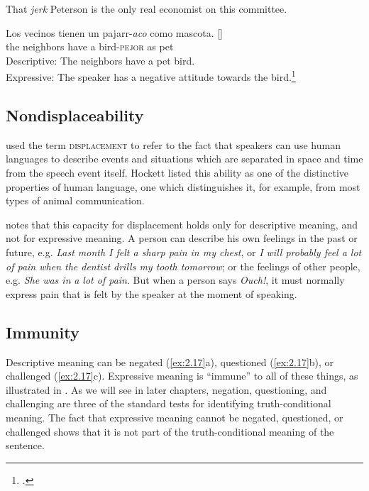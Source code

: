 \ea \label{ex:2.15}
That \textit{jerk} Peterson is the only real economist on this committee.
\z

\ea \label{ex:2.16}
\gll Los  vecinos  tienen  un  pajarr-\textit{aco}  como  mascota.  []\\
the  neighbors  have  a  bird-\textsc{pejor}  as  pet\\
\glt Descriptive: The neighbors have a pet bird.\\
Expressive: The speaker has a negative attitude towards the bird.\footnote{\citet{Fortin2011}.}
\z

\subsection{Nondisplaceability}\label{sec:2.6.2}

\citet{Hockett1958,Hockett1960} used the term \textsc{displacement} to refer to the fact that speakers can use human languages to describe events and situations which are separated in space and time from the speech event itself. Hockett listed this ability as one of the distinctive properties of human language, one which distinguishes it, for example, from most types of animal communication.



\citet[272]{Cruse1986} notes that this capacity for displacement holds only for descriptive meaning, and not for expressive meaning. A person can describe his own feelings in the past or future, e.g. \textit{Last month I felt a sharp pain in my chest}, or \textit{I will probably feel a lot of pain when the dentist drills my tooth tomorrow}; or the feelings of other people, e.g. \textit{She was in} \textit{a lot of pain}. But when a person says \textit{Ouch!}, it must normally express pain that is felt by the speaker at the moment of speaking.


\subsection{Immunity}\label{sec:2.6.3}

Descriptive meaning can be negated (\ref{ex:2.17}a), questioned (\ref{ex:2.17}b), or challenged (\ref{ex:2.17}c). Expressive meaning is “immune” to all of these things, as illustrated in . As we will see in later chapters, negation, questioning, and challenging are three of the standard tests for identifying truth-conditional meaning. The fact that expressive meaning cannot be negated, questioned, or challenged shows that it is not part of the truth-conditional meaning of the sentence.


